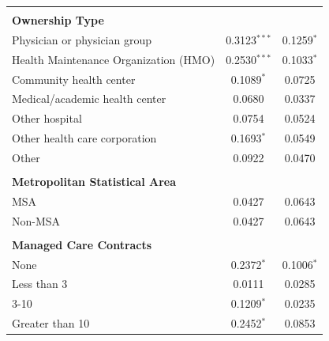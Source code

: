 \documentclass[12pt]{report}
\begin{document}
{\begin{center}
\begin{longtable}{lcc}
                                       &                          &                           \\
\textbf{Ownership Type}                &                          &                           \\
Physician or physician group           & 0.3123$^{***}$               & 0.1259$^{*}$                \\
Health Maintenance Organization (HMO)  & 0.2530$^{***}$               & 0.1033$^{*}$                \\
Community health center                & 0.1089$^{*}$               & 0.0725                    \\
Medical/academic health center         & 0.0680                   & 0.0337                    \\
Other hospital                         & 0.0754                   & 0.0524                    \\
Other health care corporation          & 0.1693$^{*}$               & 0.0549                    \\
Other                                  & 0.0922                   & 0.0470                    \\
                                       &                          &                           \\
\textbf{Metropolitan Statistical Area} &                          &                           \\
MSA                                    & 0.0427                   & 0.0643                    \\
Non-MSA                                & 0.0427                   & 0.0643                    \\
                                       &                          &                           \\
\textbf{Managed Care Contracts}        &                          &                           \\
None                                   & 0.2372$^{*}$               & 0.1006$^{*}$                \\
Less than 3                            & 0.0111                   & 0.0285                    \\
3-10                                   & 0.1209$^{*}$               & 0.0235                    \\
Greater than 10                        & 0.2452$^{*}$               & 0.0853                    \\

\end{longtable}
\end{center}}
\end{document}
